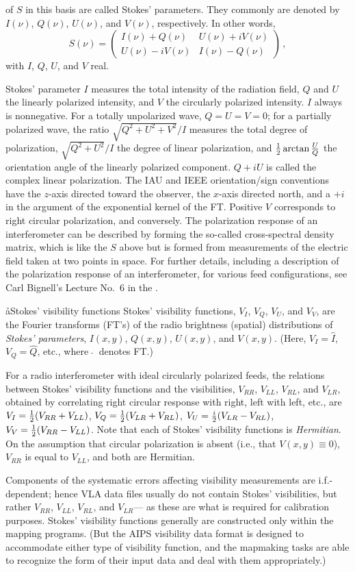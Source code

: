 of $S$ in this basis are called Stokes' parameters.
They commonly are denoted by $I(\nu)$, $Q(\nu)$, $U(\nu)$, and $V(\nu)$,
respectively.
In other words,
$$S(\nu)=\left(\begin{array}{cc} I(\nu)+Q(\nu) & U(\nu)+iV(\nu)\\
                  U(\nu)-iV(\nu)& I(\nu)-Q(\nu) \end{array}\right)\,,$$
with $I$, $Q$, $U$, and $V$ real.
\par
Stokes' parameter $I$ measures the total intensity of the radiation
field, $Q$ and $U$ the linearly polarized intensity, and $V$ the
circularly polarized intensity.
$I$ always is nonnegative.
For a totally unpolarized wave, $Q=U=V=0$; for a partially polarized
wave, the ratio $\sqrt{Q^2+U^2+V^2}/I$ measures the total
degree of polarization,
$\sqrt{Q^2+U^2}/I$ the degree of linear polarization,
and ${1\over2}\arctan{U\over Q}$ the orientation angle
of the linearly polarized component.
$Q+iU$ is called the complex linear polarization.
The IAU and IEEE orientation/sign conventions have the $z$-axis
directed toward the observer, the $x$-axis directed north,
and a $+i$ in the argument of the exponential kernel of the FT.
Positive $V$ corresponds to right circular polarization, and conversely.
The polarization response of an interferometer can be described
by forming the so-called cross-spectral density matrix, which is like
the $S$ above but is formed from measurements of the electric field
taken at two points in space.
For further details, including a description
of the polarization response of an interferometer,
for various feed configurations, see Carl Bignell's
Lecture No.~6 in the \wsp.

\aa{Stokes' visibility functions}
Stokes' visibility functions, $V_I$, $V_Q$, $V_U$, and $V_V$,
are the Fourier transforms (FT's) of the radio brightness (spatial)
distributions of {\it Stokes' parameters},
$I(x,y)$, $Q(x,y)$, $U(x,y)$, and $V(x,y)$.
(Here, $V_I=\hat I$, $V_Q=\hat Q$, etc., where $\ \hat {}\ $ denotes FT.)
\par
For a radio interferometer with ideal circularly polarized feeds,
the relations between Stokes' visibility functions
and the visibilities, $V_{RR}$, $V_{LL}$, $V_{RL}$, and $V_{LR}$,
obtained by correlating right circular response with right,
left with left, etc., are
$V_I={1\over2}(V_{RR}+V_{LL})$, $V_Q={1\over2}(V_{LR}+V_{RL})$,
$V_U={i\over2}(V_{LR}-V_{RL})$, $V_V={1\over2}(V_{RR}-V_{LL})$.
Note that each of Stokes' visibility functions is {\it Hermitian}.
On the assumption that circular polarization is absent
(i.e., that $V(x,y)\equiv0$), $V_{RR}$ is equal to $V_{LL}$,
and both are Hermitian.
\par
Components of the systematic errors affecting visibility
measurements are i.f.-dependent;
hence VLA \uv data files usually do not contain Stokes'
visibilities, but rather $V_{RR}$, $V_{LL}$, $V_{RL}$, and $V_{LR}$---%
as these are what is required for calibration purposes.
Stokes' visibility functions generally are constructed only within
the mapping programs.
(But the AIPS visibility data format is designed to accommodate
either type of visibility function, and the mapmaking tasks are
able to recognize the form of their input data and deal with them
appropriately.)

